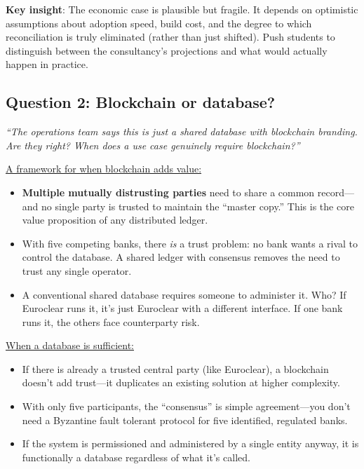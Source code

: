 \documentclass[11pt]{article}
\begin{document}
\medskip
\noindent\textbf{Key insight}: The economic case is plausible but fragile. It depends on optimistic assumptions about adoption speed, build cost, and the degree to which reconciliation is truly eliminated (rather than just shifted). Push students to distinguish between the consultancy's projections and what would actually happen in practice.

\subsection*{Question 2: Blockchain or database?}

\textit{``The operations team says this is just a shared database with blockchain branding. Are they right? When does a use case genuinely require blockchain?''}

\medskip
\noindent\underline{A framework for when blockchain adds value:}
\begin{itemize}[leftmargin=*]
\item \textbf{Multiple mutually distrusting parties} need to share a common record---and no single party is trusted to maintain the ``master copy.'' This is the core value proposition of any distributed ledger.
\item With five competing banks, there \textit{is} a trust problem: no bank wants a rival to control the database. A shared ledger with consensus removes the need to trust any single operator.
\item A conventional shared database requires someone to administer it. Who? If Euroclear runs it, it's just Euroclear with a different interface. If one bank runs it, the others face counterparty risk.
\end{itemize}

\medskip
\noindent\underline{When a database is sufficient:}
\begin{itemize}[leftmargin=*]
\item If there is already a trusted central party (like Euroclear), a blockchain doesn't add trust---it duplicates an existing solution at higher complexity.
\item With only five participants, the ``consensus'' is simple agreement---you don't need a Byzantine fault tolerant protocol for five identified, regulated banks.
\item If the system is permissioned and administered by a single entity anyway, it is functionally a database regardless of what it's called.
\end{itemize}
\end{document}
